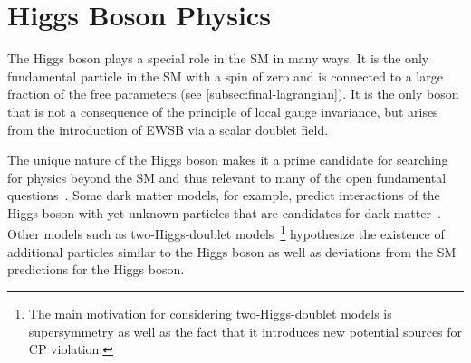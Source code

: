 \chapter{Higgs Boson Physics}
\label{chap:higgs}


The Higgs boson plays a special role in the SM in many ways.
It is the only fundamental particle in the SM with a spin of zero and is connected to a large fraction of the free parameters (see \cref{subsec:final-lagrangian}). 
It is the only boson that is not a consequence of the principle of local gauge invariance, but arises from the introduction of EWSB via a scalar doublet field. 

The unique nature of the Higgs boson makes it a prime candidate for searching for physics beyond the SM and thus relevant to many of the open fundamental questions~\cite{2019BHeinemann}. 
Some dark matter models, for example, predict interactions of the Higgs boson with yet unknown particles that are candidates for dark matter~\cite{Baumgart_2009,Kaplan_2009,Dienes_2012}. 
Other models such as two-Higgs-doublet models~\cite{Branco_2012}\footnote{The main motivation for considering two-Higgs-doublet models is supersymmetry as well as the fact that it introduces new potential sources for CP violation.} hypothesize the existence of additional particles similar to the Higgs boson as well as deviations from the SM predictions for the Higgs boson.

